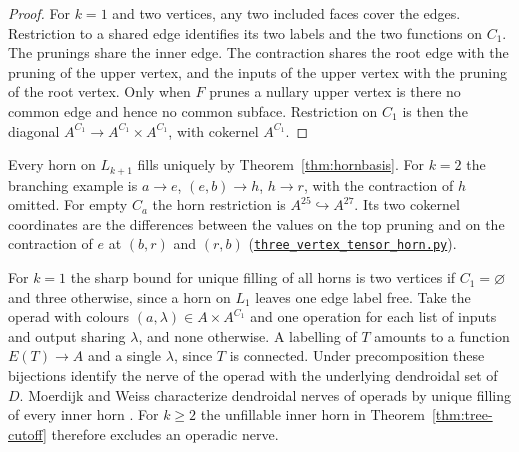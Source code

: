 \begin{proof}
For $k=1$ and two vertices, any two included faces cover the edges.
Restriction to a shared edge identifies its two labels and the two functions
on $C_1$. The prunings share the inner edge. The contraction shares
the root edge with the pruning of the upper vertex, and the inputs of
the upper vertex with the pruning of the root vertex. Only when $F$ prunes
a nullary upper vertex is there no common edge and hence no common subface.
Restriction on $C_1$ is then the diagonal
$A^{C_1}\to A^{C_1}\times A^{C_1}$, with cokernel $A^{C_1}$.
\end{proof}

Every horn on $L_{k+1}$ fills uniquely by Theorem~\ref{thm:hornbasis}.
For $k=2$ the branching example is $a\to e$, $(e,b)\to h$, $h\to r$, with
the contraction of $h$ omitted. For empty $C_a$ the horn restriction is
$A^{25}\hookrightarrow A^{27}$. Its two cokernel coordinates are the differences
between the values on the top pruning and on the contraction of $e$ at $(b,r)$ and $(r,b)$
(\href{https://github.com/flengyel/SimplicialTensors/blob/30478d42b758cd0a559c72ac6535725055e2e59e/experiments/three_vertex_tensor_horn.py}{\nolinkurl{three_vertex_tensor_horn.py}}).

For $k=1$ the sharp bound for unique filling of all horns is two vertices if
$C_1=\varnothing$ and three otherwise, since a horn on $L_1$ leaves one edge label free.
Take the operad with colours $(a,\lambda)\in A\times A^{C_1}$ and one operation
for each list of inputs and output sharing $\lambda$, and none otherwise.
A labelling of $T$ amounts to a function $E(T)\to A$ and a single $\lambda$,
since $T$ is connected. Under precomposition these bijections identify the
nerve of the operad with the underlying dendroidal set of $D$.
Moerdijk and Weiss characterize dendroidal nerves of operads by unique filling
of every inner horn \cite[Proposition~5.3 and Theorem~6.1]{MoerdijkWeissInnerKan}.
For $k\geq2$ the unfillable inner horn in Theorem~\ref{thm:tree-cutoff} therefore
excludes an operadic nerve.
